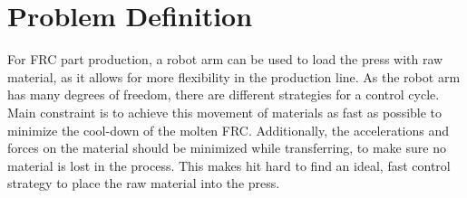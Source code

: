 \chapter{Problem Definition}

For FRC part production, a robot arm can be used to load the press with raw material, as it allows for more flexibility in the production line.
As the robot arm has many degrees of freedom, there are different strategies for a control cycle. 
Main constraint is to achieve this movement of materials as fast as possible to minimize the cool-down of the molten FRC. 
Additionally, the accelerations and forces on the material should be minimized while transferring, to make sure no material is lost in the process.
This makes hit hard to find an ideal, fast control strategy to place the raw material into the press.

